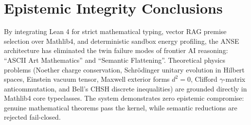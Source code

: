 \documentclass[10pt,a4paper]{article}
\begin{document}
\section{Epistemic Integrity Conclusions}
By integrating Lean 4 for strict mathematical typing, vector RAG premise selection over Mathlib4, and deterministic sandbox energy profiling, the ANSE architecture has eliminated the twin failure modes of frontier AI reasoning: ``ASCII Art Mathematics'' and ``Semantic Flattening''.
Theoretical physics problems (Noether charge conservation, Schr\"odinger unitary evolution in Hilbert spaces, Einstein vacuum tensor, Maxwell exterior forms $d^2 = 0$, Clifford $\gamma$-matrix anticommutation, and Bell's CHSH discrete inequalities) are grounded directly in Mathlib4 core typeclasses. The system demonstrates zero epistemic compromise: genuine mathematical theorems pass the kernel, while semantic reductions are rejected fail-closed.
\end{document}
